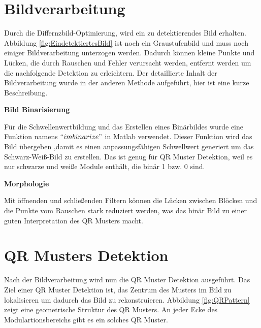 \section{Bildverarbeitung} 
Durch die Differnzbild-Optimierung, wird ein zu detektierendes Bild erhalten. Abbildung \ref{fig:EindetektiertesBild} ist noch ein Graustufenbild und muss noch einiger Bildverarbeitung unterzogen werden. Dadurch können kleine Punkte und Lücken, die durch Rauschen und Fehler verursacht werden, entfernt werden um die nachfolgende Detektion zu erleichtern. Der detaillierte Inhalt der Bildverarbeitung wurde in der anderen Methode aufgeführt, hier ist eine kurze Beschreibung. 

\textbf{Bild Binarisierung}

Für die Schwellenwertbildung und das Erstellen eines Binärbildes wurde eine Funktion namens $ ``imbinarize" $ in Matlab verwendet. Dieser Funktion wird das Bild übergeben ,damit es einen anpassungsfähigen Schwellwert generiert um das Schwarz-Weiß-Bild zu erstellen. Das ist genug für QR Muster Detektion, weil es nur schwarze und weiße Module enthält, die binär 1 bzw. 0 sind. 



\textbf{Morphologie}

Mit öffnenden und schließenden Filtern können die Lücken zwischen Blöcken und die Punkte vom Rauschen stark reduziert werden, was das binär Bild zu einer guten Interpretation des QR Musters macht. 

\section{QR Musters Detektion} 

Nach der Bildverarbeitung wird nun die QR Muster Detektion ausgeführt. Das Ziel einer QR Muster Detektion ist, das Zentrum des Musters im Bild zu lokalisieren um dadurch das Bild zu rekonstruieren. Abbildung \ref{fig:QRPattern} zeigt eine geometrische Struktur des QR Musters. An jeder Ecke des Modulartionsbereichs gibt es ein solches QR Muster.

